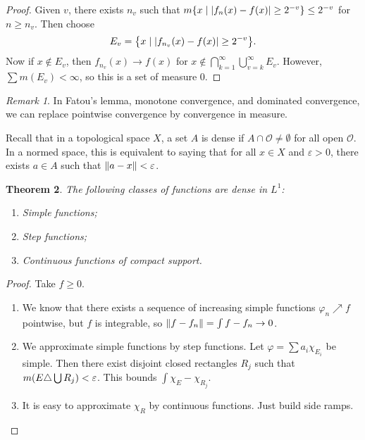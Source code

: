 \documentclass[leqno, openany]{memoir}
\newtheorem{thm}{Theorem}[chapter]
\theoremstyle{definition}
\theoremstyle{remark}
\newtheorem{rmk}[thm]{Remark}
\theoremstyle{plain}
\theoremstyle{definition}
\theoremstyle{remark}
\newcommand{\ep}{\varepsilon}
\newcommand{\mc}[1]{\mathcal{#1}}
\begin{document}
\begin{proof}
    Given $v$, there exists $n_v$ such that $m \qty{x \mid \abs{f_n(x) - f(x)} \geq 2^{-v}} \leq 2^{-v}$ for $n \geq n_v$. Then choose 
    \[ E_v = \qty{x \mid \abs{f_{n_v}(x) - f(x)} \geq 2^{-v}}. \]
    Now if $x \notin E_v$, then $f_{n_v}(x) \to f(x)$ for $x \notin \bigcap_{k=1}^{\infty} \bigcup_{v = k}^{\infty} E_v$. However, $\sum m(E_v) < \infty$, so this is a set of measure $0$.
\end{proof}

\begin{rmk}
    In Fatou's lemma, monotone convergence, and dominated convergence, we can replace pointwise convergence by convergence in measure.
\end{rmk}

Recall that in a topological space $X$, a set $A$ is dense if $A \cap \mc{O} \neq \emptyset$ for all open $\mc{O}$. In a normed space, this is equivalent to saying that for all $x \in X$ and $\ep > 0$, there exists $a \in A$ such that $\norm{a-x} < \ep$.

\begin{thm}
    The following classes of functions are dense in $L^1$:
    \begin{enumerate}
        \item Simple functions;
        \item Step functions;
        \item Continuous functions of compact support.
    \end{enumerate}
\end{thm}

\begin{proof}
    Take $f \geq 0$.
    \begin{enumerate}
        \item We know that there exists a sequence of increasing simple functions $\varphi_n \nearrow f$ pointwise, but $f$ is integrable, so $\norm{f-f_n} = \int f-f_n \to 0$.
        \item We approximate simple functions by step functions. Let $\varphi = \sum a_i \chi_{E_i}$ be simple. Then there exist disjoint closed rectangles $R_j$ such that $m\qty(E \triangle \bigcup R_j) < \ep$. This bounds $\int \chi_E - \chi_{R_j}$.
        \item It is easy to approximate $\chi_R$ by continuous functions. Just build side ramps.
    \end{enumerate}
\end{proof}
\end{document}
